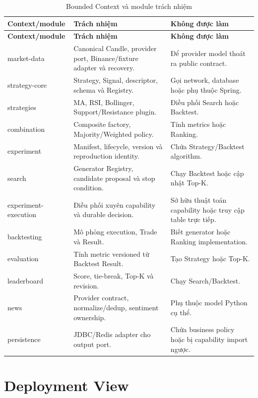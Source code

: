 \documentclass[12pt,a4paper,oneside]{report}
\begin{document}
\begin{longtable}{L{3.2cm}L{5.1cm}L{6cm}}
  \caption{Bounded Context và module trách nhiệm}\label{tab:module-responsibilities}\\
  \toprule
  \textbf{Context/module} & \textbf{Trách nhiệm} & \textbf{Không được làm} \\
  \midrule
  \endfirsthead
  \toprule
  \textbf{Context/module} & \textbf{Trách nhiệm} & \textbf{Không được làm} \\
  \midrule
  \endhead
  market-data & Canonical Candle, provider port, Binance/fixture adapter và recovery. & Để provider model thoát ra public contract. \\
  strategy-core & Strategy, Signal, descriptor, schema và Registry. & Gọi network, database hoặc phụ thuộc Spring. \\
  strategies & MA, RSI, Bollinger, Support/Resistance plugin. & Điều phối Search hoặc Backtest. \\
  combination & Composite factory, Majority/Weighted policy. & Tính metrics hoặc Ranking. \\
  experiment & Manifest, lifecycle, version và reproduction identity. & Chứa Strategy/Backtest algorithm. \\
  search & Generator Registry, candidate proposal và stop condition. & Chạy Backtest hoặc cập nhật Top-K. \\
  experiment-execution & Điều phối xuyên capability và durable decision. & Sở hữu thuật toán capability hoặc truy cập table trực tiếp. \\
  backtesting & Mô phỏng execution, Trade và Result. & Biết generator hoặc Ranking implementation. \\
  evaluation & Tính metric versioned từ Backtest Result. & Tạo Strategy hoặc Top-K. \\
  leaderboard & Score, tie-break, Top-K và revision. & Chạy Search/Backtest. \\
  news & Provider contract, normalize/dedup, sentiment ownership. & Phụ thuộc model Python cụ thể. \\
  persistence & JDBC/Redis adapter cho output port. & Chứa business policy hoặc bị capability import ngược. \\
  \bottomrule
\end{longtable}

\section{Deployment View}
\end{document}
